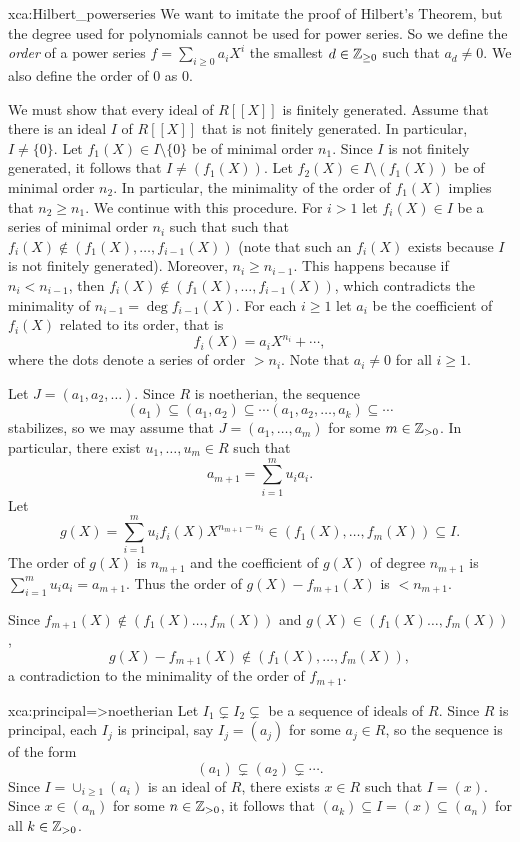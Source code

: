 \begin{sol}{xca:Hilbert_powerseries}
    We want to imitate the proof of Hilbert's Theorem, but the degree used for polynomials cannot be used for power series.
    So we define the \emph{order} of a power series 
    $f=\sum_{i\geq 0}a_iX^i$ the smallest $d\in \mathbb{Z}_{\geq 0}$ such that $a_d\neq 0$. We also define the order of 0 as 0.
    
    We must show that every ideal of $R[\![X]\!]$ is finitely generated.
    Assume that
	there is an ideal $I$ of $R[\![X]\!]$ that is not finitely generated. In particular, $I\ne\{0\}$.
	Let $f_1(X)\in I\setminus\{0\}$ be of minimal order $n_1$. 
	Since $I$ is not finitely generated, it follows that 
	$I\ne (f_1(X))$. Let $f_2(X)\in I\setminus (f_1(X))$ be
	of minimal order $n_2$.
    In particular, the minimality of the order of $f_1(X)$ implies that 
	$n_2\geq n_1$. 
	We continue with this procedure. For $i>1$ let 
	$f_i(X)\in I$ be a series of minimal order $n_i$ such that  
	such that $f_i(X)\not\in(f_1(X),\dots,f_{i-1}(X))$ (note
	that such an $f_i(X)$ exists because $I$ is not finitely generated). 
	Moreover, $n_i\geq n_{i-1}$. This happens because 
	if $n_i<n_{i-1}$, then
	$f_i(X)\not\in (f_1(X),\dots,f_{i-1}(X))$, which contradicts
	the minimality of $n_{i-1}=\deg f_{i-1}(X)$. 
	For each $i\geq1$ 
	let $a_i$ be the coefficient of $f_i(X)$ 
    related to its order, that is
	\[
	f_i(X)=a_iX^{n_i}+\cdots,
	\]
	where the dots denote a series of 
	order $>n_i$. Note that 
	$a_i\ne 0$ for all $i\geq 1$. 
	
	Let $J=(a_1,a_2,\dots)$. Since $R$ is noetherian, the sequence
	\[
	(a_1)\subseteq (a_1,a_2)\subseteq\cdots(a_1,a_2,\dots,a_k)\subseteq\cdots
	\]
	stabilizes, so we may assume that 
	$J=(a_1,\dots,a_m)$ for some $m\in\mathbb{Z}_{>0}$. 
	In particular, there exist $u_1,\dots,u_m\in R$ such that 
	\[
	a_{m+1}=\sum_{i=1}^m u_ia_i.
	\]
	Let 
	\[
	g(X)=\sum_{i=1}^mu_if_i(X)X^{n_{m+1}-n_i}\in (f_1(X),\dots,f_m(X))\subseteq I.
	\]
    The order of $g(X)$ is $n_{m+1}$ and the coefficient of $g(X)$ of degree $n_{m+1}$ is $\sum_{i=1}^mu_ia_i=a_{m+1}$.
    Thus the order of $g(X)-f_{m+1}(X)$ is $<n_{m+1}$. 
	
	Since $f_{m+1}(X)\not\in (f_1(X)\dots,f_m(X))$ and $g(X)\in (f_1(X)\dots,f_m(X))$, 
	\[
	g(X)-f_{m+1}(X)\not\in (f_1(X),\dots,f_m(X)),
	\]
	a contradiction to the minimality of the order of $f_{m+1}$.  
\end{sol}

\begin{sol}{xca:principal=>noetherian}
	Let $I_1\subsetneq I_2\subsetneq$ be a sequence of ideals of $R$.  
	Since $R$ is principal, each $I_j$ is principal, 
	say $I_j=(a_j)$ for some $a_j\in R$, so the sequence is of the form
	\[
	(a_1)\subsetneq (a_2)\subsetneq\cdots.
	\]
	Since $I=\cup_{i\geq1}(a_i)$ is an ideal of $R$, 
	there exists $x\in R$ such that $I=(x)$. Since $x\in (a_n)$ for some $n\in\mathbb{Z}_{>0}$, 
	it follows that $(a_k)\subseteq I=(x)\subseteq (a_n)$ for all $k\in\mathbb{Z}_{>0}$. 
\end{sol}

